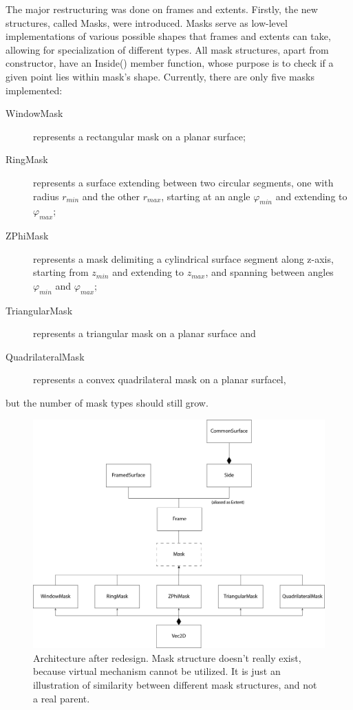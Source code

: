 \documentclass[12pt, a4paper]{article}
\begin{document}
The major restructuring was done on frames and extents. Firstly, the new structures, called Masks, were introduced. Masks serve as low-level implementations of various possible shapes that frames and extents can take, allowing for specialization of different types. All mask structures, apart from constructor, have an {\selectfont Inside()} member function, whose purpose is to check if a given point lies within mask's shape. Currently, there are only five masks implemented:
\begin{description}
	\item [WindowMask] represents a rectangular mask on a planar surface;
	\item [RingMask] represents a surface extending between two circular segments, one with radius $r_{min}$ and the other $r_{max}$, starting at an angle $\varphi_{min}$ and extending to $\varphi_{max}$;
	\item [ZPhiMask] represents a mask delimiting a cylindrical surface segment along z-axis, starting from $z_{min}$ and extending to $z_{max}$, and spanning between angles $\varphi_{min}$ and $\varphi_{max}$;
	\item[TriangularMask\footnotemark] represents a triangular mask on a planar surface and
	\item[QuadrilateralMask] represents a convex quadrilateral mask on a planar surfacel,
\end{description}
but the number of mask types should still grow.

\begin{figure}[h]
	\includegraphics[width=\textwidth]{Figures/diagram_new.png}
	\caption{Architecture after redesign. Mask structure doesn't really exist, because virtual mechanism cannot be utilized. It is just an illustration of similarity between different mask structures, and not a real parent.}
	\label{fig:newarch}
\end{figure}
\end{document}
